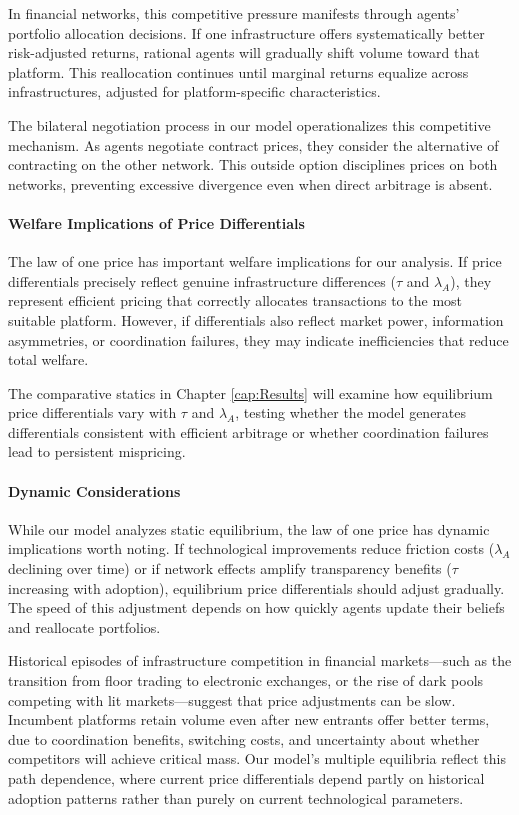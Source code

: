 In financial networks, this competitive pressure manifests through agents' portfolio allocation decisions. If one infrastructure offers systematically better risk-adjusted returns, rational agents will gradually shift volume toward that platform. This reallocation continues until marginal returns equalize across infrastructures, adjusted for platform-specific characteristics.

The bilateral negotiation process in our model operationalizes this competitive mechanism. As agents negotiate contract prices, they consider the alternative of contracting on the other network. This outside option disciplines prices on both networks, preventing excessive divergence even when direct arbitrage is absent.

\paragraph{Welfare Implications of Price Differentials}

The law of one price has important welfare implications for our analysis. If price differentials precisely reflect genuine infrastructure differences ($\tau$ and $\lambda_A$), they represent efficient pricing that correctly allocates transactions to the most suitable platform. However, if differentials also reflect market power, information asymmetries, or coordination failures, they may indicate inefficiencies that reduce total welfare.


The comparative statics in Chapter \ref{cap:Results} will examine how equilibrium price differentials vary with $\tau$ and $\lambda_A$, testing whether the model generates differentials consistent with efficient arbitrage or whether coordination failures lead to persistent mispricing.

\paragraph{Dynamic Considerations}

While our model analyzes static equilibrium, the law of one price has dynamic implications worth noting. If technological improvements reduce friction costs ($\lambda_A$ declining over time) or if network effects amplify transparency benefits ($\tau$ increasing with adoption), equilibrium price differentials should adjust gradually. The speed of this adjustment depends on how quickly agents update their beliefs and reallocate portfolios.

Historical episodes of infrastructure competition in financial markets—such as the transition from floor trading to electronic exchanges, or the rise of dark pools competing with lit markets—suggest that price adjustments can be slow. Incumbent platforms retain volume even after new entrants offer better terms, due to coordination benefits, switching costs, and uncertainty about whether competitors will achieve critical mass. Our model's multiple equilibria reflect this path dependence, where current price differentials depend partly on historical adoption patterns rather than purely on current technological parameters.

